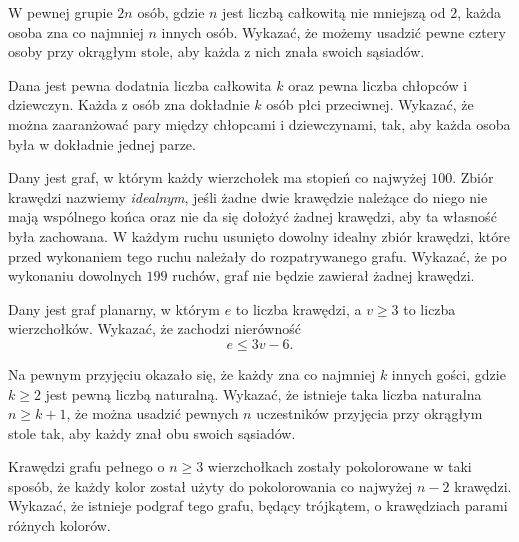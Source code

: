 \begin{problem}{1}
	W pewnej grupie $2n$ osób, gdzie $n$ jest liczbą całkowitą nie mniejszą od $2$, każda osoba zna co najmniej $n$ innych osób. Wykazać, że możemy usadzić pewne cztery osoby przy okrągłym stole, aby każda z nich znała swoich sąsiadów.
\end{problem}

\begin{problem}{2}
	Dana jest pewna dodatnia liczba całkowita $k$ oraz pewna liczba chłopców i dziewczyn. Każda z osób zna dokładnie $k$ osób płci przeciwnej. Wykazać, że można zaaranżować pary między chłopcami i dziewczynami, tak, aby każda osoba była w dokładnie jednej parze.
\end{problem}

\begin{problem}{3}
	Dany jest graf, w którym każdy wierzchołek ma stopień co najwyżej $100$. Zbiór krawędzi nazwiemy \textit{idealnym}, jeśli żadne dwie krawędzie należące do niego nie mają wspólnego końca oraz nie da się dołożyć żadnej krawędzi, aby ta własność była zachowana. W każdym ruchu usunięto dowolny  idealny zbiór krawędzi, które przed wykonaniem tego ruchu należały do rozpatrywanego grafu. Wykazać, że po wykonaniu dowolnych $199$ ruchów, graf nie będzie zawierał żadnej krawędzi.
\end{problem}

\begin{problem}{4}
	Dany jest graf planarny, w którym $e$ to liczba krawędzi, a $v \geqslant 3$ to liczba wierzchołków. Wykazać, że zachodzi nierówność
	\[
		e \leqslant 3v - 6.
	\]
\end{problem}

\begin{problem}{5}
	Na pewnym przyjęciu okazało się, że każdy zna co najmniej $k$ innych gości, gdzie $k \geqslant 2$ jest pewną liczbą naturalną. Wykazać, że istnieje taka liczba naturalna $n\geqslant k + 1$, że można usadzić pewnych $n$ uczestników przyjęcia przy okrągłym stole tak, aby każdy znał obu swoich sąsiadów.
\end{problem}

\begin{problem}{6}
	Krawędzi grafu pełnego o $n \geqslant 3$ wierzchołkach zostały pokolorowane w taki sposób, że każdy kolor został użyty do pokolorowania co najwyżej $n - 2$ krawędzi. Wykazać, że istnieje podgraf tego grafu, będący trójkątem, o krawędziach parami różnych kolorów.
\end{problem}
